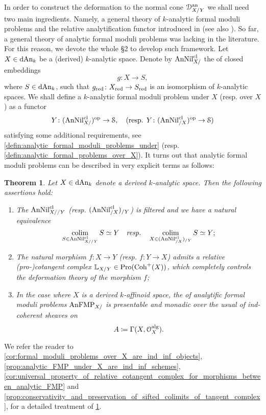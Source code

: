 \documentclass[10pt,a4paper,reqno]{amsart} %
\theoremstyle{plain}
\newtheorem{thm}{Theorem}[section]
\theoremstyle{definition}
\theoremstyle{remark}
\numberwithin{equation}{section}
\begin{document}
In order to construct the deformation to the normal cone $\mathcal D_{X/ Y}^\mathrm{an}$ we shall need two main ingredients. Namely, a general theory of $k$-analytic
formal moduli problems and the relative analytification functor introduced in \cite{Holstein_Analytification_of_mapping_stacks} (see also \cite[\S 6]{Porta_Yu_NQK}).
So far, a general theory of analytic formal moduli problems was lacking in the literature. For this reason, we devote the whole \S 2
to develop such framework. Let $X \in \mathrm{dAn}_k$ be a (derived) $k$-analytic space. Denote by $\mathrm{AnNil}_{X/ }^{\mathrm{cl}}$ the \infcat of closed embeddings
    \[
        g\colon X \to S,  
    \]
where $S \in \mathrm{dAn}_k$, such that $g_{\mathrm{red}} \colon X_{\mathrm{red}} \to S_{\mathrm{red}}$ is an isomorphism of $k$-analytic spaces. We shall define a $k$-analytic formal moduli problem
under $X$ (resp. over $X$) as a functor
    \[
        Y \colon (\mathrm{AnNil}^{\mathrm{cl}}_{X/ })^ \mathrm{op} \to \mathcal S,  \quad \textrm{(resp. $Y \colon (\mathrm{AnNil}^{\mathrm{cl}}_{/ X}) ^\mathrm{op} \to \mathcal S$)}
    \]
satisfying some additional requirements, see \cref{defin:analytic_formal_moduli_problems_under} (resp. \cref{defin:analytic_formal_problems_over_X}).
It turns out that analytic formal moduli problems can be described in very explicit terms as follows:
\begin{thm} \label{intro-thm3}
    Let $X \in \mathrm{dAn}_k$ denote a derived $k$-analytic space. Then the following assertions hold:
    \begin{enumerate}
        \item The \infcat $\mathrm{AnNil}_{X/ /Y}^{\mathrm{cl}}$ (resp. $(\mathrm{AnNil}_{/ X}^{\mathrm{cl}})_{/ Y}$) is filtered and we have a natural equivalence
            \[
                \operatorname*{colim}_{S \in \mathrm{AnNil}^{\mathrm{cl}}_{X/ / Y}} S \simeq Y \quad \textit{resp.} \quad \operatorname*{colim}_{X \in (\mathrm{AnNil}_{/ X}^{\mathrm{cl}})_{/ Y}} S \simeq Y; 
            \]
        \item The natural morphism $f \colon X \to Y$ (resp. $f \colon Y \to X$)
        admits a relative (pro-)cotangent complex $\mathbb L_{X/ Y} \in \mathrm{Pro}(\mathrm{Coh}^+(X))$, which completely controls the deformation
        theory of the morphism $f$;
        \item In the case where $X$ is a derived $k$-affinoid space, the \infcat of analytific formal moduli problems $\mathrm{AnFMP}_{X/ }$ is presentable and
        monadic over the usual \infcat of ind-coherent sheaves on 
            \[A \coloneqq \Gamma(X, \mathcal O_X^\mathrm{alg}).\]
    \end{enumerate}
\end{thm}

We refer the reader to \cref{cor:formal_moduli_problems_over_X_are_ind_inf_objects}, \cref{prop:analytic_FMP_under_X_are_ind_inf_schemes},
\cref{cor:universal_property_of_relative_cotangent_complex_for_morphisms_between_analytic_FMP} and \cref{prop:conservativity_and_preservation_of_sifted_colimits_of_tangent_complex},
for a detailed treatment of \cref{intro-thm3}. 
\end{document}
